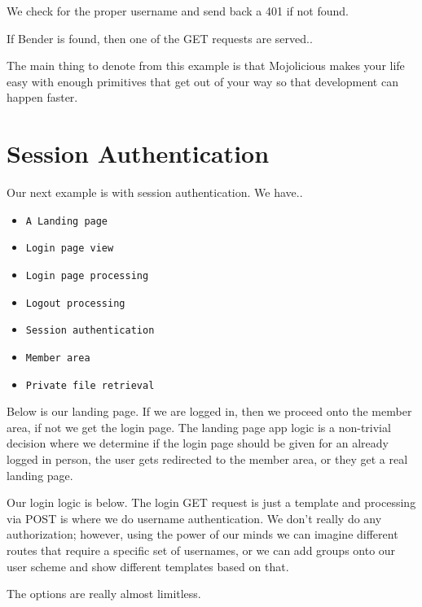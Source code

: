 \documentclass[14pt]{extreport}
\newcommand\Small{\fontsize{12}{13.0}\fontencoding{T1}\selectfont}
\newcommand*\LSTfont{\Small\ttfamily\SetTracking{encoding=*}{-60}\lsstyle}
\begin{document}
We check for the proper username and send back a 401 if not found.

If Bender is found, then one of the GET requests are served..



The main thing to denote from this example is that Mojolicious makes your life
easy with enough primitives that get out of your way so that development can happen 
faster.

\section{Session Authentication}

Our next example is with session authentication.  We have..

\begin{itemize} \itemsep1pt \parskip0pt 
\item \verb|A Landing page|
\item \verb|Login page view|
\item \verb|Login page processing|
\item \verb|Logout processing|
\item \verb|Session authentication|
\item \verb|Member area|
\item \verb|Private file retrieval|
\end{itemize}

Below is our landing page.  If we are logged in, then we proceed onto the
member area, if not we get the login page.  The landing page app logic is a
non-trivial decision where we determine if the login page should be given for
an already logged in person, the user gets redirected to the member area, or
they get a real landing page.



Our login logic is below.  The login GET request is just a template and
processing via POST is where we do username authentication.  We don't really do
any authorization; however, using the power of our minds we can imagine
different routes that require a specific set of usernames, or we can add groups
onto our user scheme and show different templates based on that.

The options are really almost limitless.


\end{document}
